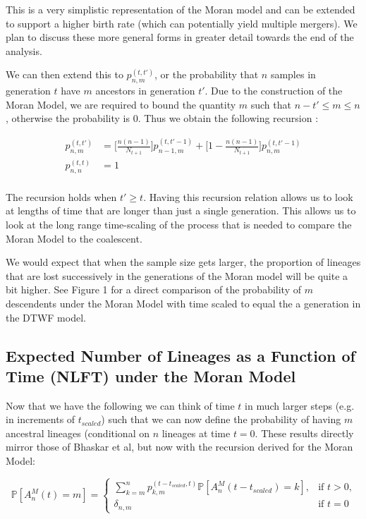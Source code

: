 \documentclass[11pt]{article}
\begin{document}
This is a very simplistic representation of the Moran model and can be extended to support a higher birth rate (which can potentially yield multiple mergers). We plan to discuss these more general forms in greater detail towards the end of the analysis. 

We can then extend this to $p^{(t, t')}_{n,m}$, or the probability that $n$ samples in generation $t$ have $m$  ancestors in generation $t'$. Due to the construction of the Moran Model, we are required to bound the quantity $m$ such that $n-t' \leq m \leq n$, otherwise the probability is $0$. Thus we obtain the following recursion :

$$
\begin{aligned}
	p^{(t, t')}_{n,m} &= \Bigg[\frac{n(n-1)}{N_{t+1}}\Bigg] p^{(t, t'-1)}_{n-1, m} + \Bigg[1 - \frac{n(n-1)}{N_{t+1}}\Bigg] p^{(t, t'-1)}_{n,m}\\
	p^{(t, t)}_{n,n} &= 1\\
\end{aligned}
$$

The recursion holds when $t' \geq t$. Having this recursion relation allows us to look at lengths of time that are longer than just a single generation. This allows us to look at the long range time-scaling of the process that is needed to compare the Moran Model to the coalescent.  

We would expect that when the sample size gets larger, the proportion of lineages that are lost successively in the generations of the Moran model will be quite a bit higher. See Figure 1 for a direct comparison of the probability of $m$ descendents under the Moran Model with time scaled to equal the a generation in the DTWF model. 

\subsection{Expected Number of Lineages as a Function of Time (NLFT) under the Moran Model}

Now that we have the following we can think of time $t$ in much larger steps (e.g. in increments of $t_{scaled}$) such that we can now define the probability of having $m$ ancestral lineages (conditional on $n$ lineages at time $t = 0$. These results directly mirror those of Bhaskar et al, but now with the recursion derived for the Moran Model:

 \begin{equation*}
	 \mathbb{P}[A^M_n(t) = m] =
	 \begin{cases} 
		 \sum^n_{k=m}  p^{(t-t_{scaled}, t)}_{k,m} \mathbb{P}[A^M_n (t-t_{scaled}) = k],  &\text{if $t > 0$,}
	 	 \\
		 \delta_{n,m} &\text{if $t = 0$}
	 \end{cases}
 \end{equation*}
\end{document}
